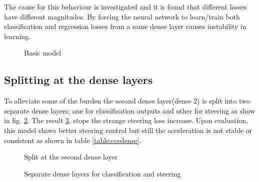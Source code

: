 The cause for this behaviour is investigated and it is found that different losses have
different magnitudes. By forcing the neural network to learn/train both classification and
regression losses from a same dense layer causes instability in learning.

\begin{figure}[t]
	\centering
    \def\svgwidth{0.8\textwidth}
    \caption{Basic model}
    \label{fig:ds3categoricalcrossentropybasic}
    \vspace*{-0.30in}
\end{figure}
\subsection{Splitting at the dense layers}
To alleviate some of the burden the second dense layer(dense 2) is split into two separate dense
layers; one for classification outputs and other for steering as show in fig. \ref{fig:steeringdensesplit}. The result \ref{fig:ds3categoricalcrossentropydense}, stops
the strange steering loss increase. Upon evaluation, this model shows better steering
control but still the acceleration is not stable or consistent as shown in table
\ref{table:ccedense}.
\begin{figure}[!ht]
	\centering
    \def\svgwidth{0.2\textwidth}
    \caption{Split at the second dense layer}
    \label{fig:steeringdensesplit}
\end{figure}

\begin{figure}[!h]
	\centering
    \def\svgwidth{0.8\textwidth}
    \caption{Separate dense layers for classification and steering}
    \label{fig:ds3categoricalcrossentropydense}
\end{figure}

